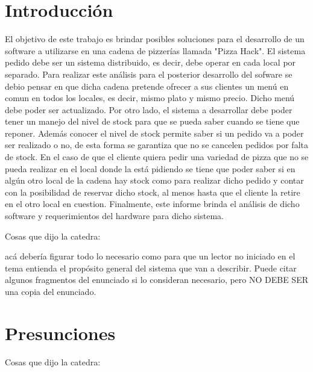 \documentclass[a4paper,10pt]{article}
\begin{document}
\tableofcontents

\newpage


\section*{Introducci\'on}

El objetivo de este trabajo es brindar posibles soluciones para el desarrollo de un software a utilizarse en una cadena de pizzer\'ias llamada "Pizza Hack". El sistema pedido debe ser un sistema distribuido, es decir, debe operar en cada local por separado. Para realizar este an\'alisis para el posterior desarrollo del sofware se debio pensar en que dicha cadena pretende ofrecer a sus clientes un men\'u en comun en todos los locales, es decir, mismo plato y mismo precio. Dicho men\'u debe poder ser actualizado. Por otro lado, el sistema a desarrollar debe poder tener un manejo del nivel de stock para que se pueda saber cuando se tiene que reponer. Adem\'as conocer el nivel de stock permite saber si un pedido va a poder ser realizado o no, de esta forma se garantiza que no se cancelen pedidos por falta de stock. En el caso de que el cliente quiera pedir una variedad de pizza que no se pueda realizar en el local donde la est\'a pidiendo se tiene que poder saber si en alg\'un otro local de la cadena hay stock como para realizar dicho pedido y contar con la posibilidad de reservar dicho stock, al menos hasta que el cliente la retire en el otro local en cuestion. Finalmente, este informe brinda el an\'alisis de dicho software y requerimientos del hardware para dicho sistema.

Cosas que dijo la catedra:

acá debería figurar todo lo necesario como para que un
lector no iniciado en el tema entienda el propósito general del
sistema que van a describir. Puede citar algunos fragmentos del
enunciado si lo consideran necesario, pero NO DEBE SER una copia del
enunciado.

\section*{Presunciones}

Cosas que dijo la catedra:
\end{document}
